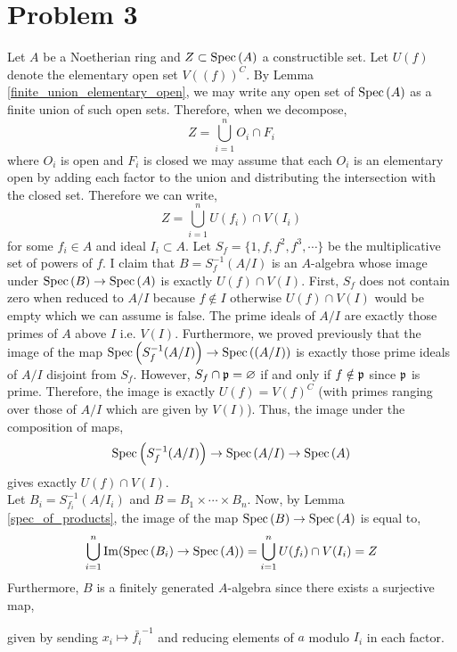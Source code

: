 \documentclass[12pt]{extarticle}
\begin{document}
\section*{Problem 3}

Let $A$ be a Noetherian ring and $Z \subset \mathrm{Spec}\left( A \right)$ a constructible set. Let $U(f)$ denote the elementary open set $V((f))^C$. By Lemma \ref{finite_union_elementary_open}, we may write any open set of $\mathrm{Spec}\left( A \right)$ as a finite union of such open sets. Therefore, when we decompose,
\[ Z = \bigcup_{i = 1}^n O_i \cap F_i \]
where $O_i$ is open and $F_i$ is closed we may assume that each $O_i$ is an elementary open by adding each factor to the union and distributing the intersection with the closed set. Therefore we can write,
\[ Z = \bigcup_{i = 1}^n U(f_i) \cap V(I_i) \]
for some $f_i \in A$ and ideal $I_i \subset A$. Let $S_f = \{1, f, f^2, f^3, \cdots \}$ be the multiplicative set of powers of $f$. I claim that $B = S_f^{-1} (A / I)$ is an $A$-algebra whose image under $\mathrm{Spec}\left( B \right) \to \mathrm{Spec}\left( A \right)$ is exactly $U(f) \cap V(I)$. First, $S_f$ does not contain zero when reduced to $A/I$ because $f \notin I$ otherwise $U(f) \cap V(I)$ would be empty which we can assume is false. The prime ideals of $A / I$ are exactly those primes of $A$ above $I$ i.e. $V(I)$. Furthermore, we proved previously that the image of the map $\mathrm{Spec}\left( S_f^{-1}(A / I) \right) \to \mathrm{Spec}\left( (A / I) \right)$ is exactly those prime ideals of $A / I$ disjoint from $S_f$. However, $S_f \cap \mathfrak{p} = \varnothing$ if and only if $f \notin \mathfrak{p}$ since $\mathfrak{p}$ is prime. Therefore, the image is exactly $U(f) = V(f)^C$ (with primes ranging over those of $A/I$ which are given by $V(I)$). Thus, the image under the composition of maps,
\[ \mathrm{Spec}\left( S^{-1}_f (A / I) \right) \to \mathrm{Spec}\left( A / I \right) \to \mathrm{Spec}\left( A \right) \]
gives exactly $U(f) \cap V(I)$. 
\bigskip\\
Let $B_i = S^{-1}_{f_i} (A / I_i)$ and $B = B_1 \times \cdots \times B_n$. 
Now, by Lemma \ref{spec_of_products}, the image of the map $\mathrm{Spec}\left( B \right) \to \mathrm{Spec}\left( A \right)$ is equal to,
\[ \bigcup_{i = 1}^n \mathrm{Im}(\mathrm{Spec}\left( B_i \right) \to \mathrm{Spec}\left( A \right)) = \bigcup_{i = 1}^n U(f_i) \cap V(I_i) = Z \]
Furthermore, $B$ is a finitely generated $A$-algebra since there exists a surjective map,
\begin{center}
\end{center}
given by sending $x_i \mapsto \bar{f_i}^{-1}$ and reducing elements of $a$ modulo $I_i$ in each factor. 
\end{document}
